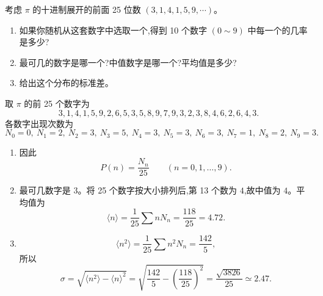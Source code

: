 \begin{question}
考虑 $\pi$ 的十进制展开的前面 25 位数 $(3,1,4,1,5,9,\cdots)$。
\begin{enumerate}
\item 如果你随机从这套数字中选取一个,得到 10 个数字 $(0\sim 9)$ 中每一个的几率是多少?
\item 最可几的数字是哪一个?中值数字是哪一个?平均值是多少?
\item 给出这个分布的标准差。
\end{enumerate}
\end{question}
\begin{solution}
取 $\pi$ 的前 25 个数字为
\[
3,1,4,1,5,9,2,6,5,3,5,8,9,7,9,3,2,3,8,4,6,2,6,4,3.
\]
各数字出现次数为
\[
N_0=0,\ N_1=2,\ N_2=3,\ N_3=5,\ N_4=3,\ N_5=3,\ N_6=3,\ N_7=1,\ N_8=2,\ N_9=3.
\]
\begin{enumerate}
\item 因此
\[
P(n)=\frac{N_n}{25}\qquad(n=0,1,\ldots,9).
\]
\item 最可几数字是 $3$。将 25 个数字按大小排列后,第 13 个数为 $4$,故中值为 $4$。平均值为
\[
\langle n\rangle=\frac{1}{25}\sum nN_n=\frac{118}{25}=4.72.
\]
\item
\[
\langle n^2\rangle=\frac{1}{25}\sum n^2N_n=\frac{142}{5},
\]
所以
\[
\sigma=\sqrt{\langle n^2\rangle-\langle n\rangle^2}
=\sqrt{\frac{142}{5}-\left(\frac{118}{25}\right)^2}
=\frac{\sqrt{3826}}{25}\simeq 2.47.
\]
\end{enumerate}
\end{solution}

